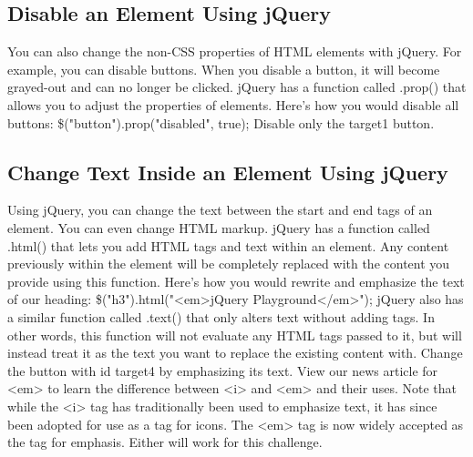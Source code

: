 \documentclass{article}%
\begin{document}
%
\subsection{Disable an Element Using jQuery}%
\label{subsec:DisableanElementUsingjQuery}%
You can also change the non{-}CSS properties of HTML elements with jQuery. For example, you can disable buttons.\newline%
When you disable a button, it will become grayed{-}out and can no longer be clicked.\newline%
jQuery has a function called .prop() that allows you to adjust the properties of elements.\newline%
Here's how you would disable all buttons:\newline%
\$("button").prop("disabled", true);\newline%
Disable only the target1 button.\newline%

%
\subsection{Change Text Inside an Element Using jQuery}%
\label{subsec:ChangeTextInsideanElementUsingjQuery}%
Using jQuery, you can change the text between the start and end tags of an element. You can even change HTML markup.\newline%
jQuery has a function called .html() that lets you add HTML tags and text within an element. Any content previously within the element will be completely replaced with the content you provide using this function.\newline%
Here's how you would rewrite and emphasize the text of our heading:\newline%
\$("h3").html("<em>jQuery Playground</em>");\newline%
jQuery also has a similar function called .text() that only alters text without adding tags. In other words, this function will not evaluate any HTML tags passed to it, but will instead treat it as the text you want to replace the existing content with.\newline%
Change the button with id target4 by emphasizing its text.\newline%
View our news article for <em> to learn the difference between <i> and <em> and their uses.\newline%
Note that while the <i> tag has traditionally been used to emphasize text, it has since been adopted for use as a tag for icons. The <em> tag is now widely accepted as the tag for emphasis. Either will work for this challenge.\newline%
\end{document}
